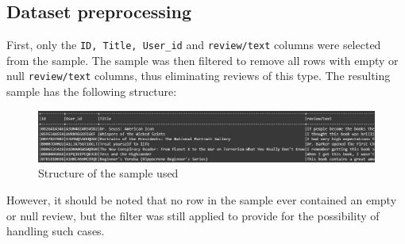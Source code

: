 \documentclass[12pt, a4paper]{article}
\begin{document}
\subsection{Dataset preprocessing}
First, only the \texttt{ID, Title, User\_id} and \texttt{review/text} columns were selected from the sample. The sample was then filtered to remove all rows with empty or null \texttt{review/text} columns, thus eliminating reviews of this type. The resulting sample has the following structure:
\begin{figure}[H]
    \centering
    \includegraphics[width=\linewidth]{Screenshot 2025-09-04 103020.png}
    \caption{Structure of the sample used}
    \label{fig:placeholder}
\end{figure}
However, it should be noted that no row in the sample ever contained an empty or null review, but the filter was still applied to provide for the possibility of handling such cases.
\end{document}
